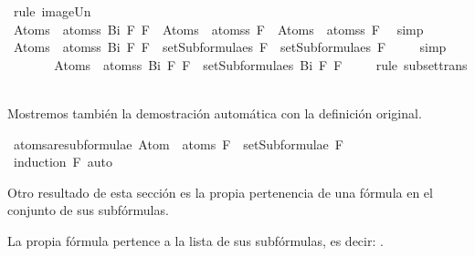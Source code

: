 \begin{isabellebody}
\ {\isacharparenleft}rule\ image{\isacharunderscore}Un{\isacharparenright}\isanewline
\ \ \ \ \isamarkupfalse%
\ \isamarkupfalse%
\ {\isachardoublequoteopen}Atom{\isacharunderscore}s\ {\isacharbackquote}\ atoms{\isacharunderscore}s\ {\isacharparenleft}Bi\ F{}\ F{}{\isacharparenright}\ {\isacharequal}\ Atom{\isacharunderscore}s\ {\isacharbackquote}\ atoms{\isacharunderscore}s\ F{}\ {\isasymunion}\ Atom{\isacharunderscore}s\ {\isacharbackquote}\ atoms{\isacharunderscore}s\ F{}{\isachardoublequoteclose}\ \isamarkupfalse%
\ simp\isanewline
\ \ \ \ \isamarkupfalse%
\ \isamarkupfalse%
\ {\isachardoublequoteopen}Atom{\isacharunderscore}s\ {\isacharbackquote}\ atoms{\isacharunderscore}s\ {\isacharparenleft}Bi\ F{}\ F{}{\isacharparenright}\ {\isasymsubseteq}\ setSubformulae{\isacharunderscore}s\ F{}\ {\isasymunion}\ setSubformulae{\isacharunderscore}s\ F{}{\isachardoublequoteclose}\ \isamarkupfalse%
\ {}\ \isamarkupfalse%
\ simp\isanewline
\ \ \ \ \isamarkupfalse%
\ \isamarkupfalse%
\ {\isachardoublequoteopen}Atom{\isacharunderscore}s\ {\isacharbackquote}\ atoms{\isacharunderscore}s\ {\isacharparenleft}Bi\ F{}\ F{}{\isacharparenright}\ {\isasymsubseteq}\ setSubformulae{\isacharunderscore}s\ {\isacharparenleft}Bi\ F{}\ F{}{\isacharparenright}{\isachardoublequoteclose}\ \isamarkupfalse%
\ {}\ \isamarkupfalse%
\ {\isacharparenleft}rule\ subset{\isacharunderscore}trans{\isacharparenright}\isanewline
\ \ \isamarkupfalse%
\isanewline
{}\isamarkupfalse%
%
\endisatagproof
{\isafoldproof}%
%
\isadelimproof
%
\endisadelimproof
%
\begin{isamarkuptext}%
Mostremos también la demostración automática con la definición original.%
\end{isamarkuptext}\isamarkuptrue%
\isamarkupfalse%
\ atoms{\isacharunderscore}are{\isacharunderscore}subformulae{\isacharcolon}\ {\isachardoublequoteopen}Atom\ {\isacharbackquote}\ atoms\ F\ {\isasymsubseteq}\ setSubformulae\ F{\isachardoublequoteclose}\isanewline
%
\isadelimproof
\ \ %
\endisadelimproof
%
\isatagproof
{}\isamarkupfalse%
\ {\isacharparenleft}induction\ F{\isacharparenright}\ auto%
\endisatagproof
{\isafoldproof}%
%
\isadelimproof
%
\endisadelimproof
%
\begin{isamarkuptext}%
Otro resultado de esta sección es la propia pertenencia de una fórmula en el conjunto 
de sus subfórmulas. 
\begin{lema}
    La propia fórmula pertence a la lista de sus subfórmulas, es decir: .
  \end{lema}


\end{isamarkuptext}
\end{isabellebody}
